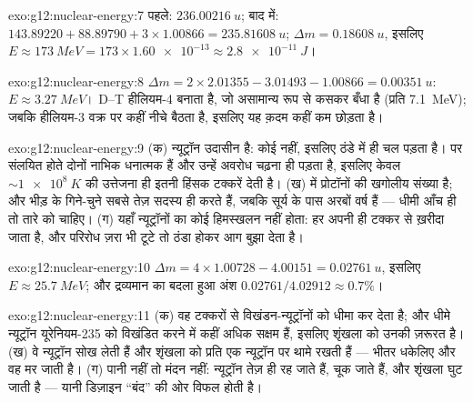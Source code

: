 \begin{solution}{exo:g12:nuclear-energy:7}
पहले: $\qty{236.00216}{u}$; बाद में: $143.89220 + 88.89790 +
3 \times 1.00866 = \qty{235.81608}{u}$; $\Delta m = \qty{0.18608}{u}$, इसलिए $E \approx \qty{173}{MeV} = 173 \times \num{1.60e-13} \approx
\qty{2.8e-11}{J}$।
\end{solution}

\begin{solution}{exo:g12:nuclear-energy:8}
$\Delta m = 2 \times 2.01355 - 3.01493 - 1.00866 = \qty{0.00351}{u}$: $E \approx \qty{3.27}{MeV}$। D--T हीलियम-4 बनाता है, जो असामान्य रूप से कसकर बँधा है (प्रति
 \qty{7.1}{MeV}); जबकि हीलियम-3 वक्र पर कहीं नीचे बैठता है, इसलिए
यह क़दम कहीं कम छोड़ता है।
\end{solution}

\begin{solution}{exo:g12:nuclear-energy:9}
(क) न्यूट्रॉन उदासीन है: कोई  नहीं, इसलिए 
ठंडे में ही चल पड़ता है। पर संलयित होते दोनों नाभिक धनात्मक हैं और उन्हें अवरोध
चढ़ना ही पड़ता है, इसलिए केवल $\sim \qty{1e8}{K}$ की उत्तेजना ही इतनी हिंसक टक्करें देती है।
(ख)  में प्रोटॉनों की खगोलीय संख्या है; और भीड़ के गिने-चुने सबसे तेज़ सदस्य
ही  करते हैं, जबकि सूर्य के पास अरबों वर्ष हैं --- धीमी आँच ही तो तारे को
चाहिए। (ग) यहाँ न्यूट्रॉनों का कोई हिमस्खलन नहीं होता: हर  अपनी ही
टक्कर से ख़रीदा जाता है, और परिरोध ज़रा भी टूटे तो  ठंडा होकर आग
बुझा देता है।
\end{solution}

\begin{solution}{exo:g12:nuclear-energy:10}
$\Delta m = 4 \times 1.00728 - 4.00151 = \qty{0.02761}{u}$, इसलिए $E \approx \qty{25.7}{MeV}$; और द्रव्यमान का बदला हुआ अंश $0.02761/4.02912 \approx 0.7\%$।
\end{solution}

\begin{solution}{exo:g12:nuclear-energy:11}
(क) वह टक्करों से विखंडन-न्यूट्रॉनों को धीमा कर देता है; और धीमे
न्यूट्रॉन यूरेनियम-235 को विखंडित करने में कहीं अधिक सक्षम हैं, इसलिए
शृंखला को उनकी ज़रूरत है। (ख) वे न्यूट्रॉन सोख लेती हैं और शृंखला को प्रति
 एक न्यूट्रॉन पर थामे रखती हैं --- भीतर धकेलिए और वह मर जाती है।
(ग) पानी नहीं तो मंदन नहीं: न्यूट्रॉन तेज़ ही रह जाते हैं, चूक जाते हैं, और
शृंखला घुट जाती है --- यानी डिज़ाइन ``बंद'' की ओर विफल होती है।
\end{solution}

